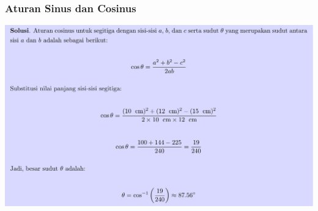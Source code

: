 \documentclass[pdflatex,compress,mathserif]{beamer}
\begin{document}
\begin{frame}
	\frametitle{Aturan Sinus dan Cosinus}
	\begin{center}
		\includegraphics[width=\linewidth]{img/img28}
	\end{center}
\end{frame}
\end{document}
